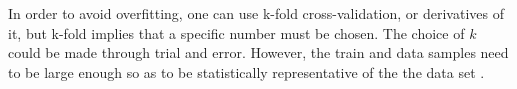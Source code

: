 In order to avoid overfitting, one can use k-fold cross-validation, or derivatives of it, but k-fold implies that a specific number must be chosen. The choice of $k$ could be made through trial and error. However, the train and data samples need to be large enough so as to be statistically representative of the the data set \cite{Refaeilzadeh2009}. 






